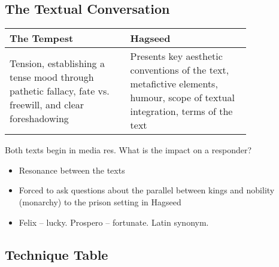 	\subsection{The Textual Conversation}

		\def\arraystretch{1.5}
		\begin{table}[H]
			\centering
			\begin{tabular}{ p{0.4\linewidth} |p{0.4\linewidth} }
				The Tempest & Hagseed \\ \hline
				Tension, establishing a tense mood through pathetic fallacy, fate vs. freewill, and clear foreshadowing & Presents key aesthetic conventions of the text, metafictive elements, humour, scope of textual integration, terms of the text
			\end{tabular}
		\end{table}

		Both texts begin in media res. What is the impact on a responder?
		\begin{itemize}
			\item Resonance between the texts
			\item Forced to ask questions about the parallel between kings and nobility (monarchy) to the prison setting in Hagseed
			\item Felix – lucky. Prospero – fortunate. Latin synonym.
		\end{itemize}

	\subsection{Technique Table}
	
